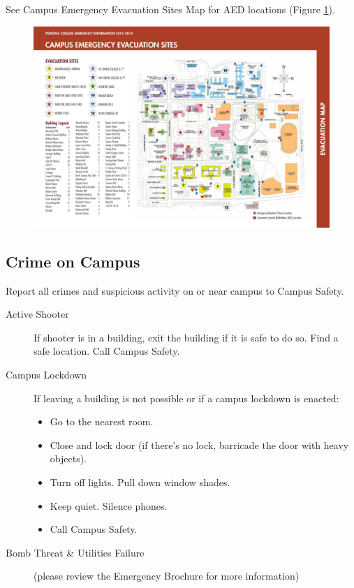 \documentclass[12pt]{../SOP3_beta}
\begin{document}
\NP See Campus Emergency Evacuation Sites Map for AED locations (Figure \ref{fig:evacmap}).

\begin{figure}
\label{fig:evacmap}
\includegraphics{evacuation-map.pdf}
\end{figure}

\subsection*{Crime on Campus}

\NP Report all crimes and suspicious activity on or near campus to Campus Safety.

\begin{description}
  \item[Active Shooter]If shooter is in a building, exit the building if it is safe to do so. Find a safe location. Call Campus Safety.
  \item[Campus Lockdown] If leaving a building is not possible or if a campus lockdown is enacted:
\begin{itemize}
  \item Go to the nearest room.
  \item Close and lock door (if there’s no lock, barricade the door with heavy objects).
  \item Turn off lights. Pull down window shades.
  \item Keep quiet. Silence phones.
  \item Call Campus Safety.
\end{itemize}
  \item[Bomb Threat \& Utilities Failure](please review the Emergency Brochure for more information)
\end{description}
\end{document}

